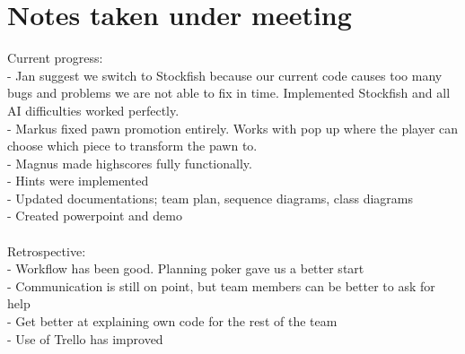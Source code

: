 \documentclass[letterpaper,11pt]{article}
\begin{document}
\section*{Notes taken under meeting}
Current progress:\\
- Jan suggest we switch to Stockfish because our current code causes too many bugs and problems we are not able to fix in time. Implemented Stockfish and all AI difficulties worked perfectly.\\
- Markus fixed pawn promotion entirely. Works with pop up where the player can choose which piece to transform the pawn to.\\
- Magnus made highscores fully functionally.\\
- Hints were implemented\\
- Updated documentations; team plan, sequence diagrams, class diagrams\\
- Created powerpoint and demo\\\\
Retrospective:\\
- Workflow has been good. Planning poker gave us a better start\\
- Communication is still on point, but team members can be better to ask for help\\
- Get better at explaining own code for the rest of the team\\
- Use of Trello has improved
\end{document}

